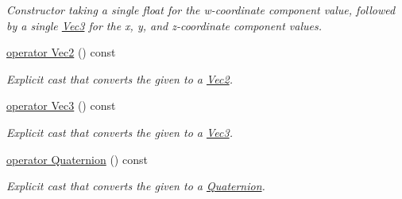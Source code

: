 \begin{DoxyCompactItemize}
\begin{DoxyCompactList}\small\item\em Constructor taking a single float for the w-\/coordinate component value, followed by a single \hyperlink{classgofxmath_1_1_vec3}{Vec3} for the x, y, and z-\/coordinate component values. \end{DoxyCompactList}\item 
\hyperlink{classgofxmath_1_1_vec4_a46d1da2bdf21d29ca62ed273326823d6}{operator Vec2} () const 
\begin{DoxyCompactList}\small\item\em Explicit cast that converts the given to a \hyperlink{classgofxmath_1_1_vec2}{Vec2}. \end{DoxyCompactList}\item 
\hyperlink{classgofxmath_1_1_vec4_a5826aad6a886cc00e7c618b2e2c5dac4}{operator Vec3} () const 
\begin{DoxyCompactList}\small\item\em Explicit cast that converts the given to a \hyperlink{classgofxmath_1_1_vec3}{Vec3}. \end{DoxyCompactList}\item 
\hyperlink{classgofxmath_1_1_vec4_ac4626cd0f87afd8d5e17989fc2bc5371}{operator Quaternion} () const 
\begin{DoxyCompactList}\small\item\em Explicit cast that converts the given to a \hyperlink{classgofxmath_1_1_quaternion}{Quaternion}. \end{DoxyCompactList}\end{DoxyCompactItemize}
